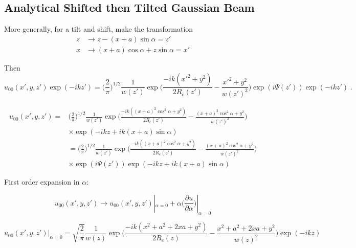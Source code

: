 \documentclass[aps,twoside,secnumarabic,balancelastpage,amsmath,amssymb,nofootinbib,hyperref=pdftex]{revtex4}
\newcommand{\bigfrac}[2]{\Big( \frac{#1}{#2}\Big)}
\begin{document}
\subsection{Analytical Shifted then Tilted Gaussian Beam}

 More generally, for a tilt and shift, make the transformation
 \begin{align}
 z &\rightarrow z- (x+a) \sin \alpha = z'
 \\x &\rightarrow (x+a) \cos \alpha + z \sin \alpha = x'
 \end{align}
 
 Then
	\begin{equation} 
		u_{00}(x',y,z') \exp(-ikz')=\bigfrac{2}{\pi}^{1/2}
		\frac{1}{w(z')}
		\exp \Big(\frac{-ik(x'^{2}+y^{2})}{2R_{c}(z')}-
		\frac{x'^{2}+y^{2}}{w(z')^{2}} \Big)
		\exp(i \Psi (z'))
		\exp(-ikz')\;.
	\end{equation}
 
	\begin{align*}
		u_{00}(x',y,z')=&
		\bigfrac{2}{\pi}^{1/2}
		\frac{1}{w(z')}
		\exp \Big(\frac{-ik((x + a)^2 \cos^2 \alpha +y^{2})}{2R_{c}(z')}-
		\frac{ (x + a)^2 \cos^2 \alpha + y^{2}}{w(z')^{2}} \Big)
		\\&		
		\times \exp(
		-ikz + ik (x+a) \sin \alpha)	
		\\&=
		\bigfrac{2}{\pi}^{1/2}
		\frac{1}{w(z')}
		\exp \Big(\frac{-ik((x + a)^2 \cos^2 \alpha			
		+y^{2})}{2R_{c}(z')}-
		\frac{(x + a)^2 \cos^2 \alpha +y^{2}}{w(z')^{2}} \Big)
		\\&		
		\times 
		\exp(i \Psi (z'))
		\exp(-ikz + ik (x+a) \sin \alpha)		
	\end{align*}
	
First order expansion in $\alpha$:

\begin{equation}
    u_{00}(x',y,z') \rightarrow
        u_{00}(x',y,z') |_{\alpha=0} + \alpha \big( \frac{\partial u}{\partial \alpha} \big)|_{\alpha=0} 
\end{equation}

\begin{equation*}
    u_{00}(x',y,z') |_{\alpha=0} =
        		\sqrt{ \frac{2}{\pi}}
                    \frac{1}{w(z)}
                    \exp \Big(\frac{-ik(x^{2} + a^2 + 2 x a		
                    +y^{2})}{2R_{c}(z)}-
                    \frac{x^{2} + a^2 + 2 x a +y^{2}}{w(z)^{2}} \Big)                	
                    \exp(-ikz)	
\end{equation*}
\end{document}
